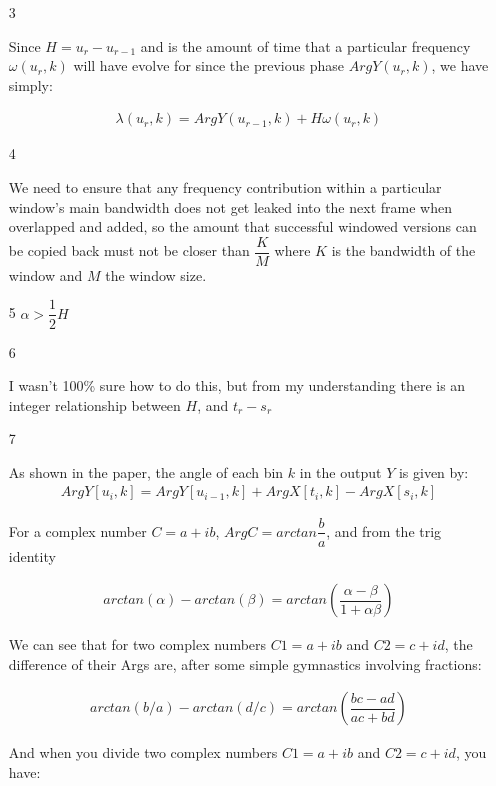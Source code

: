 \documentclass[12pt]{article}
\begin{document}
\begin{enumerate}
\item[3]{

Since $H = u_r-u_{r-1}$ and is the amount of time that a particular frequency $\omega(u_r,k)$ will have evolve for since the previous phase $Arg Y (u_r,k)$, we have simply:

\begin{align*}
\lambda(u_r, k) = Arg Y (u_{r-1},k) +H\omega(u_r,k)
\end{align*}

}

\item[4]{

We need to ensure that any frequency contribution within a particular window's main bandwidth does not get leaked into the next frame when overlapped and added, so the amount that successful windowed versions can be copied back must not be closer than $\dfrac{K}{M}$ where $K$ is the bandwidth of the window and $M$ the window size.

}

\item[5]{
$\alpha > \dfrac{1}{2}H$
}

\item[6]{

I wasn't 100\% sure how to do this, but from my understanding there is an integer relationship between $H$, and $t_r-s_r$

}

\item[7]{
As shown in the paper, the angle of each bin $k$ in the output $Y$ is given by:
\begin{align*}
Arg Y[u_i, k] = Arg Y [u_{i-1},k] + Arg X [t_i, k] - Arg X [s_i, k] 
\end{align*}

For a complex number $C = a+ib$, $ArgC = arctan\dfrac{b}{a}$, and from the trig identity

\begin{align*}
arctan(\alpha) - arctan(\beta) = arctan(\dfrac{\alpha-\beta}{1+\alpha\beta})
\end{align*}

We can see that for two complex numbers $C1 = a+ib$ and $C2 = c+id$, the difference of their Args are, after some simple gymnastics involving fractions:

\begin{align*}
arctan(b/a) - arctan(d/c) = arctan(\dfrac{bc-ad}{ac+bd})
\end{align*}

And when you divide two complex numbers $C1 = a+ib$ and $C2 = c+id$, you have:

}
\end{enumerate}
\end{document}
